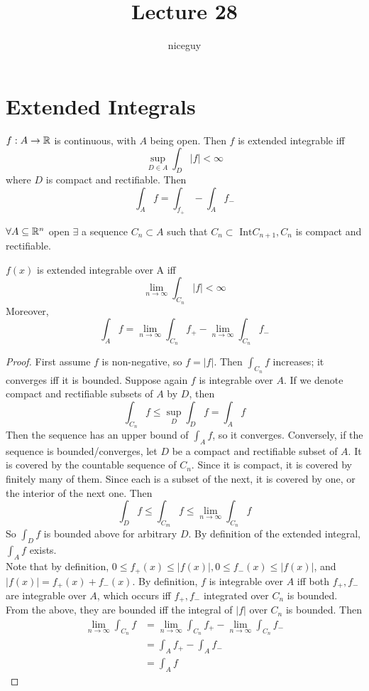 \documentclass[12pt]{article}
\title{Lecture 28}
\author{niceguy}
\begin{document}
\maketitle

\section{Extended Integrals}

$f: A \rightarrow \mathbb{R}$ is continuous, with $A$ being open. Then $f$ is extended integrable iff
$$\sup_{D\in A} \int_D |f| < \infty$$
where $D$ is compact and rectifiable. Then
$$\int_A f = \int_ f_+ - \int_A f_-$$

$\forall A \subseteq \mathbb{R}^n$ open $\exists$ a sequence $C_n \subset A$ such that $C_n \subset \text{ Int} C_{n+1}, C_n$ is compact and rectifiable.

\begin{prop}
    $f(x)$ is extended integrable over A iff
    $$\lim_{n\rightarrow\infty} \int_{C_n} |f| < \infty$$
    Moreover,
    $$\int_A f = \lim_{n\rightarrow\infty} \int_{C_n} f_+ - \lim_{n\rightarrow\infty} \int_{C_n} f_-$$
\end{prop}

\begin{proof}
    First assume $f$ is non-negative, so $f = |f|$. Then $\int_{C_n} f$ increases; it converges iff it is bounded. Suppose again $f$ is integrable over $A$. If we denote compact and rectifiable subsets of $A$ by $D$, then
    $$\int_{C_n} f \leq \sup_D \int_D f = \int_A f$$
    Then the sequence has an upper bound of $\int_A f$, so it converges. Conversely, if the sequence is bounded/converges, let $D$ be a compact and rectifiable subset of $A$. It is covered by the countable sequence of $C_n$. Since it is compact, it is covered by finitely many of them. Since each is a subset of the next, it is covered by one, or the interior of the next one. Then
    $$\int_D f \leq \int_{C_m} f \leq \lim_{n\rightarrow\infty} \int_{C_n} f$$
    So $\int_D f$ is bounded above for arbitrary $D$. By definition of the extended integral, $\int_A f$ exists. \\
    Note that by definition, $0 \leq f_+(x) \leq |f(x)|, 0 \leq f_-(x) \leq |f(x)|$, and $|f(x)| = f_+(x) + f_-(x)$. By definition, $f$ is integrable over $A$ iff both $f_+,f_-$ are integrable over $A$, which occurs iff $f_+,f_-$ integrated over $C_n$ is bounded. From the above, they are bounded iff the integral of $|f|$ over $C_n$ is bounded. Then
    \begin{align*}
        \lim_{n\rightarrow\infty} \int_{C_n} f &= \lim_{n\rightarrow\infty} \int_{C_n} f_+ - \lim_{n\rightarrow\infty} \int_{C_n} f_- \\
                                               &= \int_A f_+ - \int_A f_- \\
                                               &= \int_A f
    \end{align*}
\end{proof}
\end{document}
